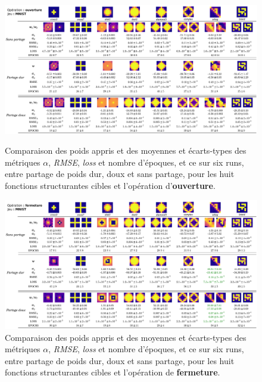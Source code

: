 \begin{figure}[!htp]
  \begin{center}
  
    \includegraphics[width=1.00\linewidth]{parts/3-contributions/B-partage_de_poids/figures/h_opening_mnist.pdf}
    \vspace{-4.0mm}
    \caption{ \centering Comparaison des poids appris et des moyennes et écarts-types des métriques $\alpha$, \textit{RMSE}, \textit{loss} et nombre d'époques, et ce sur six runs, entre partage de poids dur, doux et sans partage, pour les huit fonctions structurantes cibles et l'opération d'\textbf{ouverture}.}
    \label{fig:MSEvsMSEpFSIM_opening}

    \bigskip

    \vspace{6.0mm}
    \includegraphics[width=1.00\linewidth]{parts/3-contributions/B-partage_de_poids/figures/h_closing_mnist.pdf}
    \vspace{-4.0mm}
    \caption{ \centering Comparaison des poids appris et des moyennes et écarts-types des métriques $\alpha$, \textit{RMSE}, \textit{loss} et nombre d'époques, et ce sur six runs, entre partage de poids dur, doux et sans partage, pour les huit fonctions structurantes cibles et l'opération de \textbf{fermeture}.}
    \label{fig:MSEvsMSEpFSIM_closing}
    
  \end{center}
\end{figure}


